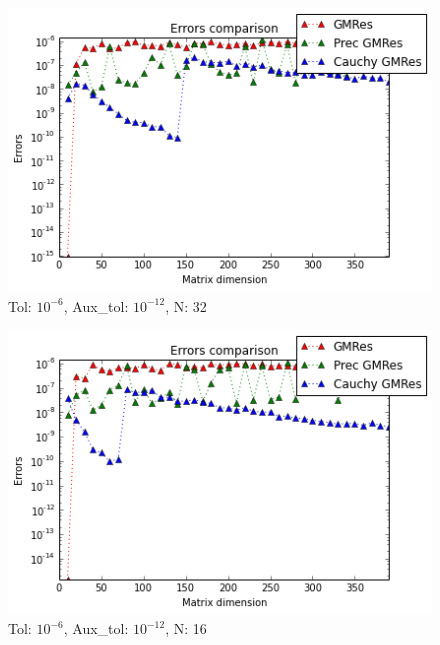 \documentclass[fleqn]{article}
\begin{document}
\begin{figure}[ht]
    \centering
    \includegraphics[scale=0.4]{images/b2.png}
    \caption{Tol: $10^{-6}$, Aux\_tol: $10^{-12}$, N: 32   }
    \label{fig:8}
\end{figure}
\newpage
\begin{figure}[ht]
    \centering
    \includegraphics[scale=0.4]{images/b3.png}
    \caption{Tol: $10^{-6}$, Aux\_tol: $10^{-12}$, N: 16}
    \label{fig:9}
\end{figure}
\end{document}
